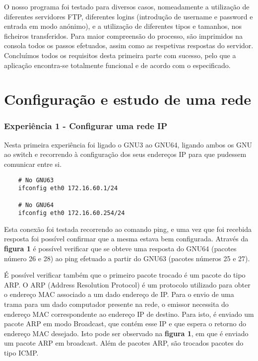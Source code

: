 \documentclass[article, a4paper, 11pt, oneside]{memoir}
\begin{document}
O nosso programa foi testado para diversos casos, nomeadamente a utilização de diferentes servidores FTP,
diferentes logins (introdução de username e password e entrada em modo anónimo), e a utilização de diferentes tipos e tamanhos, nos ficheiros transferidos.
Para maior compreensão do processo, são imprimidos na consola todos os passos efetuados, assim como as respetivas respostas do servidor.
Concluímos todos os requisitos desta primeira parte com sucesso, pelo que a aplicação encontra-se totalmente funcional e de acordo com o especificado.

\newpage
\chapter[Configuração e estudo de uma rede][Configuração e estudo de uma rede]{Configuração e estudo de uma rede} \label{\thechapter}

\subsection{Experiência 1 - Configurar uma rede IP}

Nesta primeira experiência foi ligado o GNU3 ao GNU64, ligando ambos os GNU ao switch e recorrendo à configuração dos seus endereços IP para que pudessem comunicar entre si. 
\begin{lstlisting}
	# No GNU63
	ifconfig eth0 172.16.60.1/24

	# No GNU64
	ifconfig eth0 172.16.60.254/24
\end{lstlisting} 

Esta conexão foi testada recorrendo ao comando ping, e uma vez que foi recebida resposta foi possível confirmar que a mesma estava bem configurada. 
Através da \textbf{figura 1} é possível verificar que se obteve uma resposta do GNU64 (pacotes número 26 e 28) ao ping efetuado a partir do GNU63
(pacotes números 25 e 27).

É possível verificar também que o primeiro pacote trocado é um pacote do tipo ARP. 
O ARP (Address Resolution Protocol) é um protocolo utilizado para obter o endereço MAC associado
a um dado endereço de IP. Para o envio de uma trama para um dado computador presente na rede, o emissor
necessita do endereço MAC correspondente ao endereço IP de destino. Para isto, é enviado um pacote ARP
em modo Broadcast, que contém esse IP e que espera o retorno do endereço MAC desejado.
Isto pode ser observado na \textbf{figura 1}, em que é enviado um pacote ARP em broadcast.
Além de pacotes ARP, são trocados pacotes do tipo ICMP.
\end{document}

